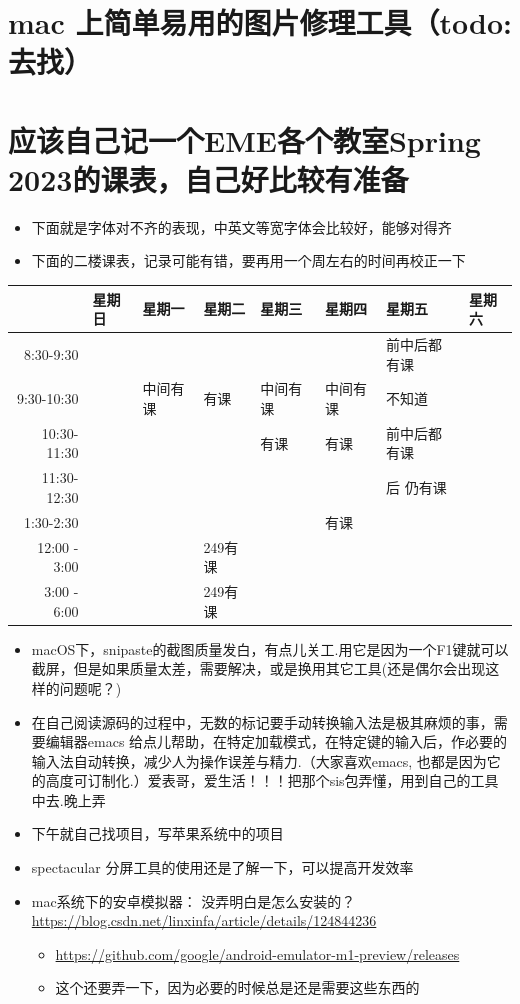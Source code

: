 \documentclass[9pt, b5paper]{article}
\begin{document}
\section{mac 上简单易用的图片修理工具（todo: 去找）}
\label{sec-7}
\section{应该自己记一个EME各个教室Spring 2023的课表，自己好比较有准备}
\label{sec-8}
\begin{itemize}
\item 下面就是字体对不齐的表现，中英文等宽字体会比较好，能够对得齐
\item 下面的二楼课表，记录可能有错，要再用一个周左右的时间再校正一下
\end{itemize}
\begin{center}
\begin{tabular}{rlllllll}
\hline
 & 星期日 & 星期一 & 星期二 & 星期三 & 星期四 & 星期五 & 星期六\\
\hline
8:30-9:30 &  &  &  &  &  & 前中后都有课 & \\
9:30-10:30 &  & 中间有课 & 有课 & 中间有 课 & 中间有课 & 不知道 & \\
10:30-11:30 &  &  &  & 有课 & 有课 & 前中后都有课 & \\
11:30-12:30 &  &  &  &  &  & 后 仍有课 & \\
\hline
1:30-2:30 &  &  &  &  & 有课 &  & \\
12:00 - 3:00 &  &  & 249有课 &  &  &  & \\
3:00 - 6:00 &  &  & 249有课 &  &  &  & \\
\hline
\end{tabular}
\end{center}
\begin{itemize}
\item macOS下，snipaste的截图质量发白，有点儿关工.用它是因为一个F1键就可以截屏，但是如果质量太差，需要解决，或是换用其它工具(还是偶尔会出现这样的问题呢？)
\item 在自己阅读源码的过程中，无数的标记要手动转换输入法是极其麻烦的事，需要编辑器emacs 给点儿帮助，在特定加载模式，在特定键的输入后，作必要的输入法自动转换，减少人为操作误差与精力.（大家喜欢emacs, 也都是因为它的高度可订制化.）爱表哥，爱生活！！！把那个sis包弄懂，用到自己的工具中去.晚上弄
\item 下午就自己找项目，写苹果系统中的项目
\item spectacular 分屏工具的使用还是了解一下，可以提高开发效率
\item mac系统下的安卓模拟器： 没弄明白是怎么安装的？\url{https://blog.csdn.net/linxinfa/article/details/124844236}
\begin{itemize}
\item \url{https://github.com/google/android-emulator-m1-preview/releases}
\item 这个还要弄一下，因为必要的时候总是还是需要这些东西的
\end{itemize}
\end{itemize}
\end{document}
